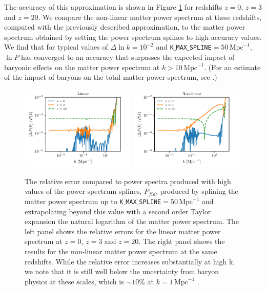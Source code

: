 \documentclass[\docopts]{\docclass}
\begin{document}
The accuracy of this approximation is shown in Figure \ref{fig:NLextrapol} for redshifts $z=0$, $z=3$ and $z=20$. We compare the non-linear matter power spectrum at these redshifts, computed with the previously described approximation, to the matter power spectrum obtained by setting the power spectrum splines to high-accuracy values. We find that for typical values of $\Delta \ln k=10^{-2}$ and {\tt K$\_$MAX$\_$SPLINE}$=50\,\text{Mpc}^{-1}$, $\ln P$ has converged to an accuracy that surpasses the expected impact of baryonic effects on the matter power spectrum at $k>10\,\text{Mpc}^{-1}$. (For an estimate of the impact of baryons on the total matter power spectrum, see \citealt{Schneider15}.) 

\begin{figure}
\centering
  \includegraphics[width=0.49\textwidth]{splacc_power_lin}
  \includegraphics[width=0.49\textwidth]{splacc_power_nl}
\caption{The relative error compared to power spectra produced with high values of the power spectrum splines, $P_{fid}$, produced by splining the matter power spectrum up to {\tt K$\_$MAX$\_$SPLINE}$=50\,\text{Mpc}^{-1}$ and extrapolating beyond this value with a second order Taylor expansion the natural logarithm of the matter power spectrum. The left panel shows the relative errors for the linear matter power spectrum at $z=0$, $z=3$ and $z=20$. The right panel shows the results for the non-linear matter power spectrum at the same redshifts. While the relative error increases substantially at high k, we note that it is still well below the uncertainty from baryon physics at these scales, which is $\sim 10\%$ at $k=1\,\text{Mpc}^{-1}$ \citep{Schneider15}.}
\label{fig:NLextrapol}
\end{figure}
\end{document}
